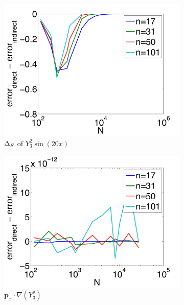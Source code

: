 \begin{figure}[htbp]
	\centering
	\begin{subfigure}[b]{0.425\textwidth}
	\includegraphics[width=1.0\textwidth]{../figures/chapter2/compare_weight_generation/lsfc_vs_px_grad_dot_px_grad/diff_of_rel_l2_errors.pdf}
	\caption{$\LaplaceBeltrami$ of $Y_{3}^{2} \sin(20 x)$}
	\end{subfigure}
	\begin{subfigure}[b]{0.425\textwidth}
	\includegraphics[width=1.0\textwidth]{../figures/chapter2/compare_weight_generation/xsfc_vs_xsfc_alt_on_sph32/diff_of_rel_l2_errors.pdf}
	\caption{$\mathbf{p}_{x} \cdot \nabla ( Y_{3}^{2})$ }
	\end{subfigure}
	\begin{subfigure}[b]{0.425\textwidth}

\end{subfigure}
\end{figure}

